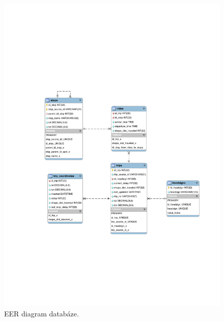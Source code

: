\begin{figure}[p]\centering
\includegraphics[width=\linewidth]{../img/eer_database}
\caption{EER diagram databáze.}
\label{obr:EER}

\end{figure}

